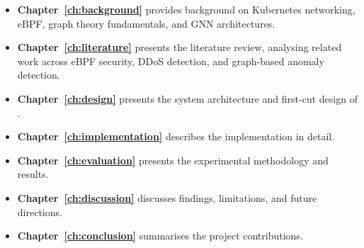 \begin{itemize}
  \item \textbf{Chapter~\ref{ch:background}} provides background on Kubernetes networking,
  eBPF, graph theory fundamentals, and GNN architectures.

  \item \textbf{Chapter~\ref{ch:literature}} presents the literature review, analysing
  related work across eBPF security, DDoS detection, and graph-based anomaly detection.

  \item \textbf{Chapter~\ref{ch:design}} presents the system architecture and first-cut
  design of \sys{}.

  \item \textbf{Chapter~\ref{ch:implementation}} describes the implementation in detail.

  \item \textbf{Chapter~\ref{ch:evaluation}} presents the experimental methodology and
  results.

  \item \textbf{Chapter~\ref{ch:discussion}} discusses findings, limitations, and future
  directions.

  \item \textbf{Chapter~\ref{ch:conclusion}} summarises the project contributions.
\end{itemize}

